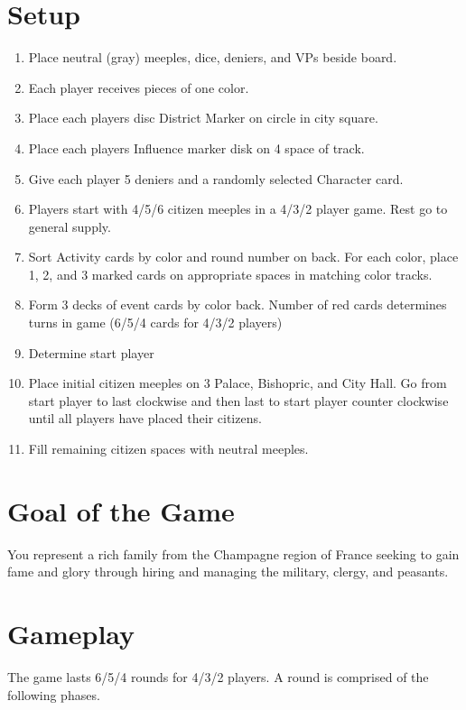 \documentclass[10pt]{article}
\newenvironment{enumerateCustom}
{\begin{enumerate}
  \setlength{\itemsep}{1pt}
  \setlength{\parskip}{0pt}
  \setlength{\parsep}{0pt}}
{\end{enumerate}}
\begin{document}
\begin{multicols*}{2}

\section*{Setup}
    \begin{enumerateCustom}
        \item Place neutral (gray) meeples, dice, deniers, and VPs beside board.
        \item Each player receives pieces of one color.
        \item Place each players disc District Marker on circle in city square.
        \item Place each players Influence marker disk on 4 space of track.
        \item Give each player 5 deniers and a randomly selected Character card.
        \item Players start with 4/5/6 citizen meeples in a 4/3/2 player game. Rest go to general supply.
        \item Sort Activity cards by color and round number on back. For each color, place 1, 2, and 3 marked cards on appropriate spaces in matching color tracks.
        \item Form 3 decks of event cards by color back. Number of red cards determines turns in game (6/5/4 cards for 4/3/2 players)
        \item Determine start player
        \item Place initial citizen meeples on 3 Palace, Bishopric, and City Hall. Go from start player to last clockwise and then last to start player counter clockwise until all players have placed their citizens.
        \item Fill remaining citizen spaces with neutral meeples.
    \end{enumerateCustom}

\section*{Goal of the Game}
You represent a rich family from the Champagne region of France seeking to gain fame and glory through hiring and managing the military, clergy, and peasants.

\section*{Gameplay}
The game lasts 6/5/4 rounds for 4/3/2 players. A round is comprised of the following phases.


\end{multicols*}
\end{document}
